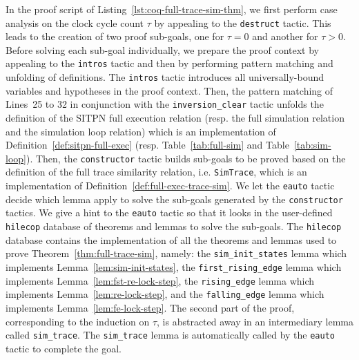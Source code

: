 \documentclass[pdflatex,sn-mathphys]{sn-jnl}%
\theoremstyle{thmstyleone}%
\theoremstyle{thmstyletwo}%
\theoremstyle{thmstylethree}%
\begin{document}
In the proof script of Listing~\ref{lst:coq-full-trace-sim-thm}, we
first perform case analysis on the clock cycle count $\tau$ by
appealing to the \texttt{destruct} tactic. This leads to the creation
of two proof sub-goals, one for $\tau=0$ and another for
$\tau>0$. Before solving each sub-goal individually, we prepare the
proof context by appealing to the \texttt{intros} tactic and then by
performing pattern matching and unfolding of definitions. The
\texttt{intros} tactic introduces all universally-bound variables and
hypotheses in the proof context. Then, the pattern matching of
Lines~25 to 32 in conjunction with the \texttt{inversion\_clear}
tactic unfolds the definition of the SITPN full execution relation
(resp. the \hvhdl{} full simulation relation and the \hvhdl{}
simulation loop relation) which is an implementation of
Definition~\ref{def:sitpn-full-exec} (resp. Table~\ref{tab:full-sim}
and Table~\ref{tab:sim-loop}).  Then, the \texttt{constructor} tactic
builds sub-goals to be proved based on the definition of the full
trace similarity relation, i.e. \texttt{SimTrace}, which is an
implementation of Definition~\ref{def:full-exec-trace-sim}. We let the
\texttt{eauto} tactic decide which lemma apply to solve the sub-goals
generated by the \texttt{constructor} tactics. We give a hint to the
\texttt{eauto} tactic so that it looks in the user-defined
\texttt{hilecop} database of theorems and lemmas to solve the
sub-goals. The \texttt{hilecop} database contains the \coq{}
implementation of all the theorems and lemmas used to prove
Theorem~\ref{thm:full-trace-sim}, namely: the
\texttt{sim\_init\_states} lemma which implements
Lemma~\ref{lem:sim-init-states}, the \texttt{first\_rising\_edge}
lemma which implements Lemma~\ref{lem:fst-re-lock-step}, the
\texttt{rising\_edge} lemma which implements
Lemma~\ref{lem:re-lock-step}, and the \texttt{falling\_edge} lemma
which implements Lemma~\ref{lem:fe-lock-step}.  The second part of the
proof, corresponding to the induction on $\tau$, is abstracted away in
an intermediary lemma called \texttt{sim\_trace}. The
\texttt{sim\_trace} lemma is automatically called by the
\texttt{eauto} tactic to complete the goal.

\end{document}
